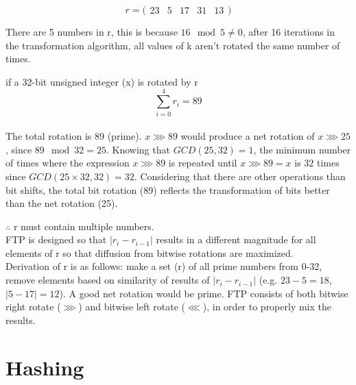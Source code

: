 \documentclass[11pt]{article}
\theoremstyle{definition}
\theoremstyle{remark}
\begin{document}
\[
r = 
\big(
\begin{matrix}
		23 & 5 & 17 & 31 & 13
\end{matrix}
\big)
\]

There are 5 numbers in r, this is because $16 \mod 5 \neq 0$, after 16 iterations in the transformation algorithm, all values of k aren't rotated the same number of times.

if a 32-bit unsigned integer (x) is rotated by r
\[
\sum_{i=0}^4 r_i = 89
\]
\\
The total rotation is 89 (prime). $x \ggg 89$ would produce a net rotation of $x \ggg 25$, since $89 \mod 32=25$. Knowing that $GCD(25, 32) = 1$, the minimum number of times where the expression $x \ggg 89$ is repeated until $x \ggg 89 = x$ is $32$ times since $GCD(25 \times 32, 32) = 32$. Considering that there are other operations than bit shifts, the total bit rotation (89) reflects the transformation of bits better than the net rotation (25).

$\therefore$ r must contain multiple numbers.
\\
FTP is designed so that $|r_i - r_{i-1}|$ results in a different magnitude for all elements of r so that diffusion from bitwise rotations are maximized.
\\
Derivation of r is as follows: make a set (r) of all prime numbers from 0-32, remove elements based on similarity of results of $|r_i - r_{i-1}|$ (e.g. $23-5=18$, $|5-17|=12$). A good net rotation would be prime. FTP consists of both bitwise right rotate ($\ggg$) and bitwise left rotate ($\lll$), in order to properly mix the results.

\section{Hashing}
\end{document}
